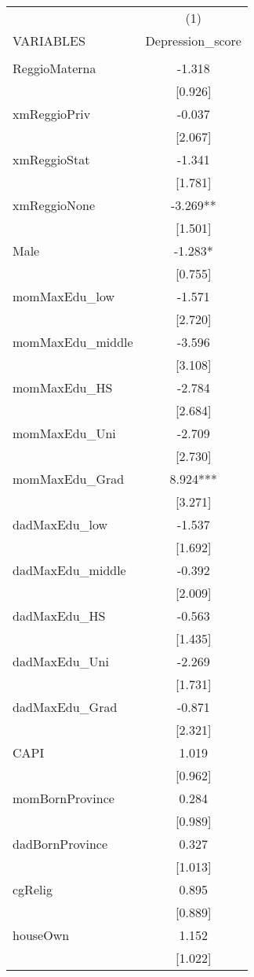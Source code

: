 \documentclass[]{article}
\begin{document}
\begin{tabular}{lc} \hline
 & (1) \\
VARIABLES & Depression\_score \\ \hline
 &  \\
ReggioMaterna & -1.318 \\
 & [0.926] \\
xmReggioPriv & -0.037 \\
 & [2.067] \\
xmReggioStat & -1.341 \\
 & [1.781] \\
xmReggioNone & -3.269** \\
 & [1.501] \\
Male & -1.283* \\
 & [0.755] \\
momMaxEdu\_low & -1.571 \\
 & [2.720] \\
momMaxEdu\_middle & -3.596 \\
 & [3.108] \\
momMaxEdu\_HS & -2.784 \\
 & [2.684] \\
momMaxEdu\_Uni & -2.709 \\
 & [2.730] \\
momMaxEdu\_Grad & 8.924*** \\
 & [3.271] \\
dadMaxEdu\_low & -1.537 \\
 & [1.692] \\
dadMaxEdu\_middle & -0.392 \\
 & [2.009] \\
dadMaxEdu\_HS & -0.563 \\
 & [1.435] \\
dadMaxEdu\_Uni & -2.269 \\
 & [1.731] \\
dadMaxEdu\_Grad & -0.871 \\
 & [2.321] \\
CAPI & 1.019 \\
 & [0.962] \\
momBornProvince & 0.284 \\
 & [0.989] \\
dadBornProvince & 0.327 \\
 & [1.013] \\
cgRelig & 0.895 \\
 & [0.889] \\
houseOwn & 1.152 \\
 & [1.022] \\

\end{tabular}
\end{document}
